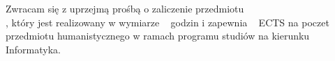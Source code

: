 \documentclass{wmiisubmission}
\begin{document}
\cracowdate
{}
\studentaddress
\addressee{\bakalarski}

\vskip 2.0cm

Zwracam się z uprzejmą prośbą o zaliczenie przedmiotu\\
\fillField{16cm}, który jest realizowany w wymiarze \fillField{1cm}~ godzin
i zapewnia \fillField{1cm}~ ECTS na poczet
przedmiotu humanistycznego w ramach programu studiów na kierunku Informatyka.

\vskip 1cm
\studentsignature
\vskip 3.0cm


\vskip 1.5cm

\end{document}
